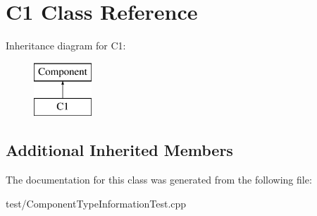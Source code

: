 \hypertarget{classC1}{}\section{C1 Class Reference}
\label{classC1}
Inheritance diagram for C1\+:\begin{figure}[H]
\begin{center}
\leavevmode
\includegraphics[height=2.000000cm]{classC1}
\end{center}
\end{figure}
\subsection*{Additional Inherited Members}


The documentation for this class was generated from the following file\+:\begin{DoxyCompactItemize}
\item 
test/Component\+Type\+Information\+Test.\+cpp\end{DoxyCompactItemize}
